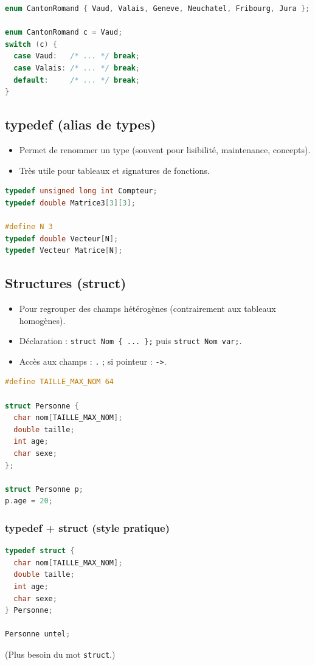 \begin{lstlisting}[language=C]
enum CantonRomand { Vaud, Valais, Geneve, Neuchatel, Fribourg, Jura };

enum CantonRomand c = Vaud;
switch (c) {
  case Vaud:   /* ... */ break;
  case Valais: /* ... */ break;
  default:     /* ... */ break;
}
\end{lstlisting}

\subsection{typedef (alias de types)}
\begin{itemize}
  \item Permet de renommer un type (souvent pour lisibilité, maintenance, concepts). 
  \item Très utile pour tableaux et signatures de fonctions. 
\end{itemize}

\begin{lstlisting}[language=C]
typedef unsigned long int Compteur;
typedef double Matrice3[3][3];

#define N 3
typedef double Vecteur[N];
typedef Vecteur Matrice[N];
\end{lstlisting}

\subsection{Structures (struct)}
\begin{itemize}
  \item Pour regrouper des champs hétérogènes (contrairement aux tableaux homogènes). 
  \item Déclaration : \texttt{struct Nom \{ ... \};} puis \texttt{struct Nom var;}.
  \item Accès aux champs : \texttt{.} ; si pointeur : \texttt{->}.
\end{itemize}

\begin{lstlisting}[language=C]
#define TAILLE_MAX_NOM 64

struct Personne {
  char nom[TAILLE_MAX_NOM];
  double taille;
  int age;
  char sexe;
};

struct Personne p;
p.age = 20;
\end{lstlisting}

\subsubsection{typedef + struct (style pratique)}
\begin{lstlisting}[language=C]
typedef struct {
  char nom[TAILLE_MAX_NOM];
  double taille;
  int age;
  char sexe;
} Personne;

Personne untel;
\end{lstlisting}
(Plus besoin du mot \texttt{struct}.) 

